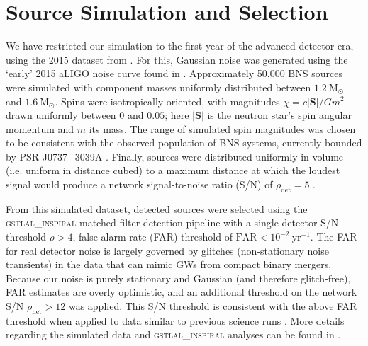 \section{Source Simulation and Selection}

We have restricted our simulation to the first year of the advanced detector era, using the 2015 dataset from \citet{Singer_2014}.  For this, Gaussian noise was generated using the `early' 2015 aLIGO noise curve found in \citet{Barsotti:2012}.  Approximately 50,000 BNS sources were simulated with component masses uniformly distributed between $1.2~\mathrm{M}_\odot$ and $1.6~\mathrm{M}_\odot$.  Spins were isotropically oriented, with magnitudes $\chi = c |\mathbf{S}|/G m^2$ drawn uniformly between $0$ and $0.05$; here $|\mathbf{S}|$ is the neutron star's spin angular momentum and $m$ its mass.  The range of simulated spin magnitudes was chosen to be consistent with the observed population of BNS systems, currently bounded by PSR J0737$-$3039A \citep{Burgay_2003,Brown_2012}.  Finally, sources were distributed uniformly in volume (i.e. uniform in distance cubed) to a maximum distance at which the loudest signal would produce a network signal-to-noise ratio (S/N) of $\rho_\mathrm{det} = 5$ \citep{Singer_2014}.

From this simulated dataset, detected sources were selected using the \textsc{gstlal\_inspiral} matched-filter detection pipeline \citep{Cannon_2012} with a single-detector S/N threshold $\rho>4$, false alarm rate (FAR) threshold of $\mathrm{FAR}<10^{-2}~\mathrm{yr}^{-1}$.  The FAR for real detector noise is largely governed by glitches (non-stationary noise transients) in the data that can mimic GWs from compact binary mergers.  Because our noise is purely stationary and Gaussian (and therefore glitch-free), FAR estimates are overly optimistic, and an additional threshold on the network S/N $\rho_\mathrm{net} > 12$ was applied.  This S/N threshold is consistent with the above FAR threshold when applied to data similar to previous science runs \cite{2013arXiv1304.0670L,Berry_2014}.  More details regarding the simulated data and \textsc{gstlal\_inspiral} analyses can be found in \citet{Singer_2014}.